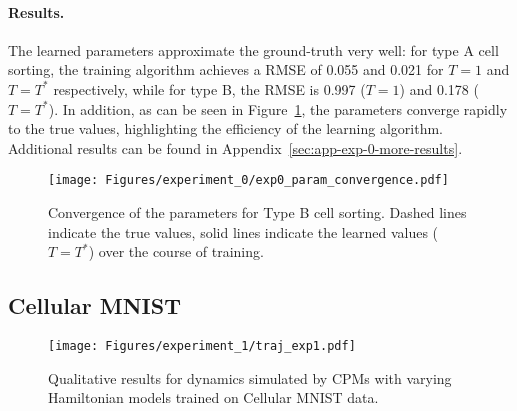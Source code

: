 \paragraph{Results.} 
The learned parameters approximate the ground-truth very well: for type A cell sorting, the training algorithm achieves a RMSE of 0.055 and 0.021 for $T=1$ and $T=T^*$ respectively, while for type B, the RMSE is 0.997 ($T=1$) and 0.178 ($T=T^*$). In addition, as can be seen in Figure~\ref{fig:exp0-param-converge}, the parameters converge rapidly to the true values, highlighting the efficiency of the learning algorithm. Additional results can be found in Appendix~\ref{sec:app-exp-0-more-results}.



\begin{figure}[tb]
    \centering
    \texttt{[image: Figures/experiment\_0/exp0\_param\_convergence.pdf]}    
    \caption{Convergence of the parameters for Type B cell sorting. Dashed lines indicate the true values, solid lines indicate the learned values ($T=T^*$) over the course of training.}
    \label{fig:exp0-param-converge}
\end{figure}


\subsection{Cellular MNIST}\label{sec:exp1}


\begin{figure}[tb]
    \centering
    \texttt{[image: Figures/experiment\_1/traj\_exp1.pdf]}
    \caption{Qualitative results for dynamics simulated by CPMs with varying Hamiltonian models trained on Cellular MNIST data.}
    \label{fig:exp-1-qualitative}
\end{figure}



